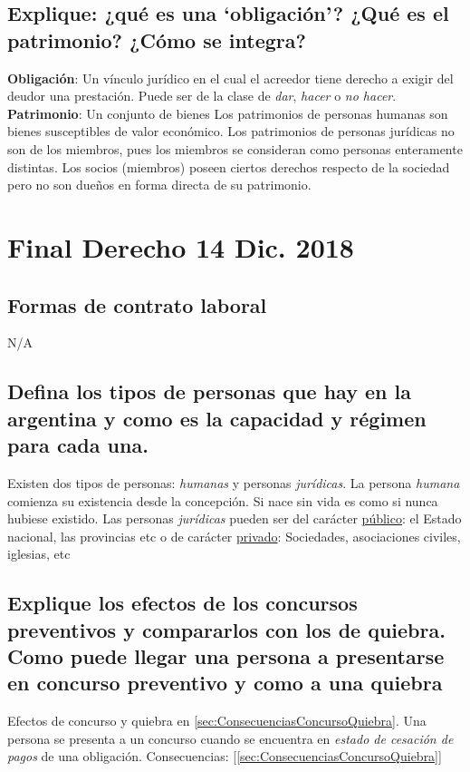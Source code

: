 \documentclass{article}
\begin{document}
\subsection{Explique: ¿qué es una ‘obligación’? ¿Qué es el patrimonio? ¿Cómo se integra?}
\textbf{Obligación}: Un vínculo jurídico en el cual el acreedor tiene derecho a exigir del deudor una prestación. Puede ser de la clase de \textit{dar}, \textit{hacer} o \textit{no hacer}. 
\textbf{Patrimonio}: Un conjunto de bienes
Los patrimonios de personas humanas son bienes susceptibles de valor económico.
Los patrimonios de personas jurídicas no son de los miembros, pues los miembros se consideran como personas enteramente distintas. Los socios (miembros) poseen ciertos derechos respecto de la sociedad pero no son dueños en forma directa de su patrimonio.


\section{Final Derecho 14 Dic. 2018}
\subsection{Formas de contrato laboral}
N/A
\subsection{Defina los tipos de personas que hay en la argentina y como es la capacidad y régimen para cada una.}
Existen dos tipos de personas: \textit{humanas} y personas \textit{jurídicas}. La persona \textit{humana} comienza su existencia desde la concepción. Si nace sin vida es como si nunca hubiese existido. Las personas \textit{jurídicas} pueden ser del carácter \underline{público}: el Estado nacional, las provincias etc o de carácter \underline{privado}: Sociedades, asociaciones civiles, iglesias, etc

\subsection{Explique los efectos de los concursos preventivos y compararlos con los de quiebra. Como puede llegar una persona a presentarse en concurso preventivo y como a una quiebra}
Efectos de concurso y quiebra en \ref{sec:ConsecuenciasConcursoQuiebra}. Una persona se presenta a un concurso cuando se encuentra en \textit{estado de cesación de pagos} de una obligación.  Consecuencias: [\ref{sec:ConsecuenciasConcursoQuiebra}]
\end{document}
